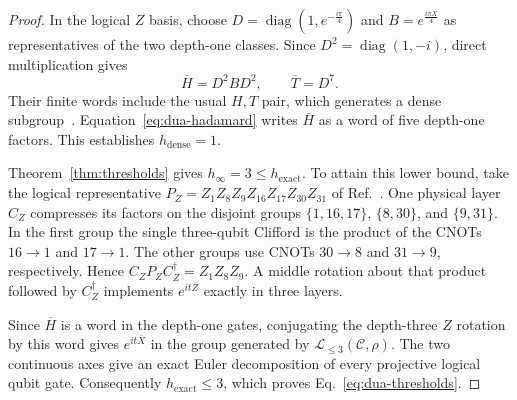 \documentclass[aps,prl,reprint,longbibliography,nofootinbib,nobibnotes]{revtex4-2}
\newif\ifshowchanges
\DeclareRobustCommand{\rev}[1]{\leavevmode{\ifshowchanges\color{RevisionPurple}%
  \hypersetup{allcolors=RevisionPurple}\fi #1%
  \ifhmode\xdef\revspacefactor{\the\spacefactor}%
    \aftergroup\revrestorespacefactor\fi}}
\newcommand{\revrestorespacefactor}{\ifhmode\spacefactor\revspacefactor\relax\fi}
\begin{document}
\begin{proof}
In the logical $Z$ basis, choose $D=\operatorname{diag}(1,e^{-\frac{i\pi}{4}})$ and
$B=e^{\frac{i\pi\overline X}{4}}$ as representatives of the two depth-one classes. Since
$D^2=\operatorname{diag}(1,-i)$, direct multiplication gives
\begin{equation}\label{eq:dua-hadamard}
 \overline H=D^2BD^2,\qquad \overline T=D^7 .
\end{equation}
Their finite words include the usual $H,T$ pair, which generates a dense subgroup~\cite{Boykin}.
Equation~\eqref{eq:dua-hadamard} writes $\overline H$ as a word of five depth-one factors. This
establishes $h_{\mathrm{dense}}=1$.

Theorem~\ref{thm:thresholds} gives $h_\infty=3\le h_{\mathrm{exact}}$. To attain this lower bound,
take the logical representative $P_Z=Z_1Z_8Z_9Z_{16}Z_{17}Z_{30}Z_{31}$ of Ref.~\rev{\cite[App.~B.1, Eq.~(B3)]{Dua}}. One physical layer $C_Z$ compresses its factors on the disjoint groups
$\{1,16,17\}$, $\{8,30\}$, and $\{9,31\}$. In the first group the single three-qubit Clifford is
the product of the CNOTs $16\to1$ and $17\to1$. The other groups use CNOTs $30\to8$ and $31\to9$,
respectively. Hence $C_ZP_ZC_Z^\dagger=Z_1Z_8Z_9$. A middle rotation about that product followed by
$C_Z^\dagger$ implements $e^{it\overline Z}$ exactly in three layers.

Since $\overline H$ is a word in the depth-one gates, conjugating the depth-three $Z$ rotation by
this word gives $e^{it\overline X}$ in the group generated by $\mathcal L_{\le3}(\mathcal C,\rho)$.
The two continuous axes give an exact Euler decomposition of every projective logical qubit gate.
Consequently $h_{\mathrm{exact}}\le3$, which proves Eq.~\eqref{eq:dua-thresholds}.
\end{proof}
\end{document}
